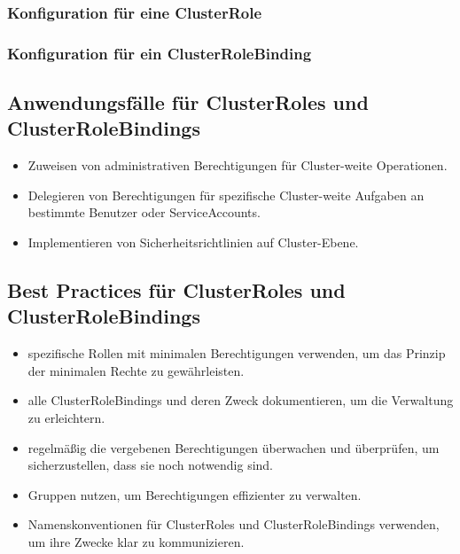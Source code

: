 \subsubsection{Konfiguration für eine ClusterRole}


\subsubsection{Konfiguration für ein ClusterRoleBinding}


\subsection{Anwendungsfälle für ClusterRoles und ClusterRoleBindings}
\begin{itemize}
    \item Zuweisen von administrativen Berechtigungen für Cluster-weite Operationen.
    \item Delegieren von Berechtigungen für spezifische Cluster-weite Aufgaben an bestimmte Benutzer oder ServiceAccounts.
    \item Implementieren von Sicherheitsrichtlinien auf Cluster-Ebene.
\end{itemize}
\newpage
\subsection{Best Practices für ClusterRoles und ClusterRoleBindings}
\begin{itemize}
    \item spezifische Rollen mit minimalen Berechtigungen verwenden, um das Prinzip der minimalen Rechte zu gewährleisten.
    \item alle ClusterRoleBindings und deren Zweck dokumentieren, um die Verwaltung zu erleichtern.
    \item regelmäßig die vergebenen Berechtigungen überwachen und überprüfen, um sicherzustellen, dass sie noch notwendig sind.
    \item Gruppen nutzen, um Berechtigungen effizienter zu verwalten.
    \item Namenskonventionen für ClusterRoles und ClusterRoleBindings verwenden, um ihre Zwecke klar zu kommunizieren.
\end{itemize}

